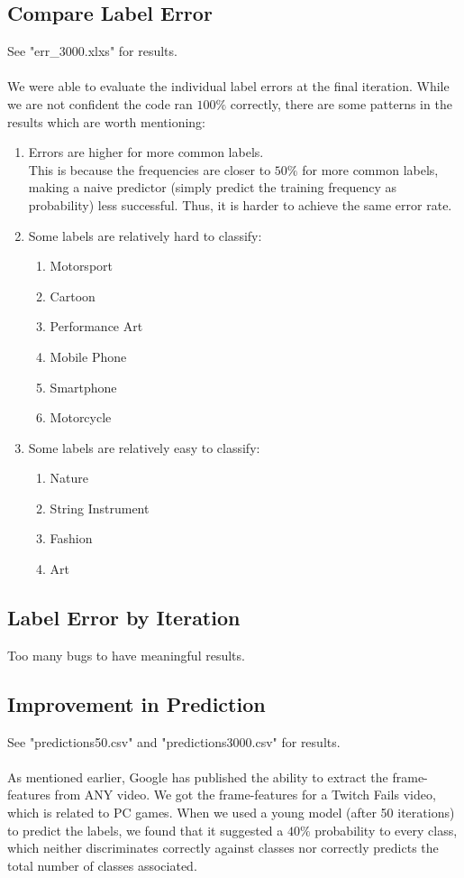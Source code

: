 \documentclass{article}
\newcommand{\ind}[0]{\indent}
\begin{document}
\subsection{Compare Label Error}
See "err\_3000.xlxs" for results. \\\\
\ind\ind We were able to evaluate the individual label errors at the final iteration. While we are not confident the code ran $100\%$ correctly, there are some patterns in the results which are worth mentioning:
\begin{enumerate}
\item Errors are higher for more common labels. \\
\ind\ind This is because the frequencies are closer to $50\%$ for more common labels, making a naive predictor (simply predict the training frequency as probability) less successful. Thus, it is harder to achieve the same error rate.
\item Some labels are relatively hard to classify:
	\begin{enumerate}
	\item Motorsport
	\item Cartoon
	\item Performance Art
	\item Mobile Phone
	\item Smartphone
	\item Motorcycle
	\end{enumerate}
\item Some labels are relatively easy to classify:
	\begin{enumerate}
	\item Nature
	\item String Instrument
	\item Fashion
	\item Art
	\end{enumerate}
\end{enumerate}

\subsection{Label Error by Iteration}
Too many bugs to have meaningful results.

\subsection{Improvement in Prediction}
See "predictions50.csv" and "predictions3000.csv" for results. \\
\\
\ind As mentioned earlier, Google has published the ability to extract the frame-features from ANY video. We got the frame-features for a Twitch Fails video, which is related to PC games. When we used a young model (after 50 iterations) to predict the labels, we found that it suggested a $40\%$ probability to every class, which neither discriminates correctly against classes nor correctly predicts the total number of classes associated.
\end{document}
